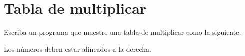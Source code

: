 \section{Tabla de multiplicar}

Escriba un programa que muestre una tabla de multiplicar como la
siguiente:

Los números deben estar alineados a la derecha.
